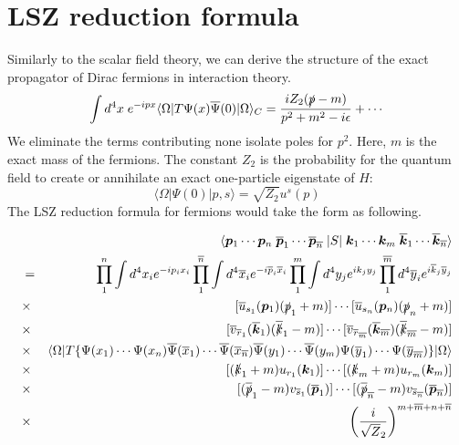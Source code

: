 \documentclass[cyan]{elegantnote}
\begin{document}
\section{LSZ reduction formula}
Similarly to the scalar field theory, we can derive the structure of the exact propagator of Dirac fermions in interaction theory.
\[\int d^4x \; e^{-ipx} \langle \Omega | T \Psi(x) \overline{\Psi}(0) | \Omega \rangle_C = \frac{iZ_2(\slashed{p}-m)}{p^2+m^2-i\epsilon} + \cdots \]
We eliminate the terms contributing none isolate poles for $p^2$. Here, $m$ is the exact mass of the fermions. The constant $Z_2$ is the probability for the quantum field to create or annihilate an exact one-particle eigenstate of $H$:
\[\langle \Omega | \Psi(0) | p,s \rangle = \sqrt{Z_2} u^s(p)\]
The LSZ reduction formula for fermions would take the form as following.
\\

\begin{newthem}
\begin{eqnarray}
&\phantom{=}& \langle \bm{p}_1 \cdots \bm{p}_n \;
\overline{\bm{p}}_1 \cdots \overline{\bm{p}}_{\overline{n}} \;
| S | \;
\bm{k}_1 \cdots \bm{k}_m \;
\overline{\bm{k}}_1 \cdots \overline{\bm{k}}_{\overline{n}} \rangle 
\nonumber \\
&=& \quad \prod_1^n \int d^4 x_i e^{-i p_ix_i }
\prod_1^{\overline{n}} \int d^4 \overline{x}_i e^{-i \overline{p}_i\overline{x}_i }
\prod_1^m \int d^4 y_j e^{ik_jy_j}
\prod_1^{\overline{m}} d^4 \overline{y}_i e^{i\overline{k}_j\overline{y}_j}
\nonumber \\
&\times & [\overline{u}_{s_1}(\bm{p}_1)(\slashed{p}_1+m)] \cdots [\overline{u}_{s_n}(\bm{p}_n)(\slashed{p}_n+m)]
\nonumber \\
&\times & [\overline{v}_{\overline{r}_1}(\overline{\bm{k}}_1)(\overline{\slashed{k}}_1 - m)] \cdots [\overline{v}_{\overline{r}_{\overline{m}}}(\overline{\bm{k}}_{\overline{m}})(\overline{\slashed{k}}_{\overline{m}} - m)]
\nonumber \\
&\times & \langle \Omega | T \{\Psi(x_1) \cdots \Psi(x_n)
\overline{\Psi}(\overline{x}_1) \cdots \overline{\Psi}(\overline{x}_{\overline{n}}) 
\overline{\Psi}(y_1) \cdots \overline{\Psi}(y_m)
\Psi(\overline{y}_1) \cdots \Psi(\overline{y}_{\overline{m}})\} 
| \Omega \rangle 
\nonumber \\
&\times & [(\slashed{k}_1+m) u_{r_1}(\bm{k}_1)] \cdots [(\slashed{k}_m+m)u_{r_m}(\bm{k}_m)] \nonumber \\
&\times & [(\overline{\slashed{p}}_1 - m) v_{\overline{s}_1}(\overline{\bm{p}}_1)] \cdots [(\overline{\slashed{p}}_{\overline{n}} - m) v_{\overline{s}_{\overline{n}}}(\overline{\bm{p}}_{\overline{n}})] \nonumber \\
&\times & \left( \frac{i}{\sqrt{Z}_2} \right) ^{m+\overline{m}+n+\overline{n}} \nonumber
\end{eqnarray}
\end{newthem}
\end{document}
